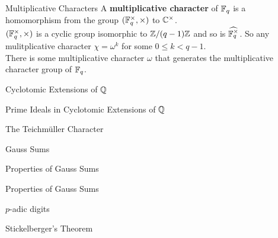 \documentclass[presentation]{beamer}
\begin{document}
\begin{frame}{Multiplicative Characters}
A \textbf{multiplicative character} of $\mathbb{F}_q$ is a homomorphism from the group $(\mathbb{F}_q^\times, \times)$ to $\mathbb{C}^\times$. 
\\


$(\mathbb{F}_q^\times, \times)$ is a cyclic group isomorphic to $\mathbb{Z}/(q - 1)\mathbb{Z}$ and so is $\widehat{\mathbb{F}_q^\times}$. So any mulitplicative character $\chi = \omega^k$ for some $0 \leq k < q-1$.
\\


There is some multiplicative character $\omega$ that generates the multiplicative character group of $\mathbb{F}_q$.

\end{frame}

\begin{frame}{Cyclotomic Extensions of $\mathbb{Q}$}

\end{frame}

\begin{frame}{Prime Ideals in Cyclotomic Extensions of $\mathbb{Q}$}

\end{frame}


\begin{frame}{The Teichm\"uller Character}

\end{frame}

\begin{frame}{Gauss Sums}

\end{frame}

\begin{frame}{Properties of Gauss Sums}

\end{frame}

\begin{frame}{Properties of Gauss Sums}

\end{frame}

\begin{frame}{$p$-adic digits}

\end{frame}

\begin{frame}{Stickelberger's Theorem}

\end{frame}
\end{document}
